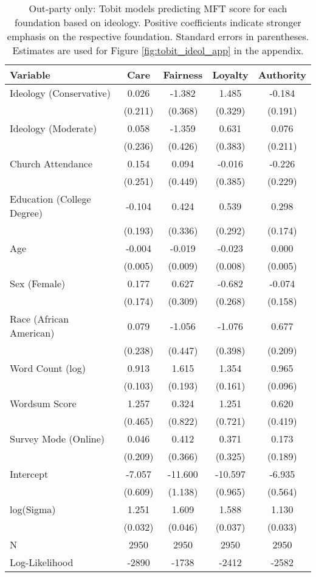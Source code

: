 \begin{table}[ht]
\centering
\caption[Out-party only: Tobit models predicting MFT score for each foundation based 
           on ideology]{Out-party only: Tobit models predicting MFT score for each foundation based 
           on ideology. Positive coefficients indicate stronger emphasis on the respective 
           foundation. Standard errors in parentheses. Estimates are used for  
           Figure \ref{fig:tobit_ideol_app} in the appendix.} 
\label{tab:tobit_out}
\begingroup\footnotesize
\begin{tabular}{lcccc}
  \hline
Variable & Care & Fairness & Loyalty & Authority \\ 
  \hline
Ideology (Conservative) &  0.026 &  -1.382 &   1.485 & -0.184 \\ 
   & (0.211) & (0.368) & (0.329) & (0.191) \\ 
  Ideology (Moderate) &  0.058 &  -1.359 &   0.631 &  0.076 \\ 
   & (0.236) & (0.426) & (0.383) & (0.211) \\ 
  Church Attendance &  0.154 &   0.094 &  -0.016 & -0.226 \\ 
   & (0.251) & (0.449) & (0.385) & (0.229) \\ 
  Education (College Degree) & -0.104 &   0.424 &   0.539 &  0.298 \\ 
   & (0.193) & (0.336) & (0.292) & (0.174) \\ 
  Age & -0.004 &  -0.019 &  -0.023 &  0.000 \\ 
   & (0.005) & (0.009) & (0.008) & (0.005) \\ 
  Sex (Female) &  0.177 &   0.627 &  -0.682 & -0.074 \\ 
   & (0.174) & (0.309) & (0.268) & (0.158) \\ 
  Race (African American) &  0.079 &  -1.056 &  -1.076 &  0.677 \\ 
   & (0.238) & (0.447) & (0.398) & (0.209) \\ 
  Word Count (log) &  0.913 &   1.615 &   1.354 &  0.965 \\ 
   & (0.103) & (0.193) & (0.161) & (0.096) \\ 
  Wordsum Score &  1.257 &   0.324 &   1.251 &  0.620 \\ 
   & (0.465) & (0.822) & (0.721) & (0.419) \\ 
  Survey Mode (Online) &  0.046 &   0.412 &   0.371 &  0.173 \\ 
   & (0.209) & (0.366) & (0.325) & (0.189) \\ 
  Intercept & -7.057 & -11.600 & -10.597 & -6.935 \\ 
   & (0.609) & (1.138) & (0.965) & (0.564) \\ 
  log(Sigma) &  1.251 &   1.609 &   1.588 &  1.130 \\ 
   & (0.032) & (0.046) & (0.037) & (0.033) \\ 
   \hline
N & 2950 & 2950 & 2950 & 2950 \\ 
  Log-Likelihood & -2890 & -1738 & -2412 & -2582 \\ 
   \hline
\end{tabular}
\endgroup
\end{table}
